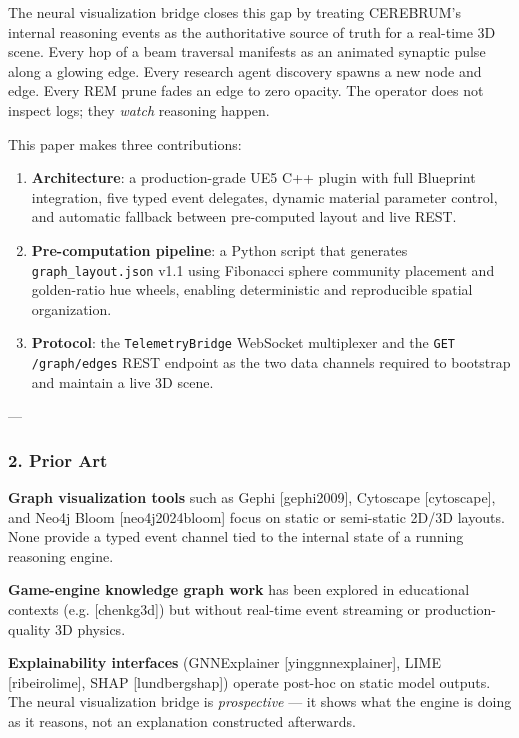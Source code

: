 The neural visua\-lization bridge closes this gap by treating CEREBRUM's internal reasoning events as the autho\-ritative source of truth for a real-time 3D scene. Every hop of a beam traversal manifests as an animated synaptic pulse along a glowing edge. Every research agent discovery spawns a new node and edge. Every REM prune fades an edge to zero opacity. The operator does not inspect logs; they \textit{watch} reasoning happen.

This paper makes three contr\-ibutions:

\begin{enumerate}
\item \textbf{Archit\-ecture}: a production-grade UE5 C++ plugin with full Blueprint integration, five typed event delegates, dynamic material parameter control, and automatic fallback between pre-computed layout and live REST.
\item \textbf{Pre-computation pipeline}: a Python script that generates \texttt{graph\_layout.json} v1.1 using Fibonacci sphere community placement and golden-ratio hue wheels, enabling deter\-ministic and repro\-ducible spatial organ\-ization.
\item \textbf{Protocol}: the \texttt{TelemetryBridge} WebSocket multiplexer and the \texttt{GET /graph/edges} REST endpoint as the two data channels required to bootstrap and maintain a live 3D scene.

\end{enumerate}
---

\subsubsection{2. Prior Art}

\textbf{Graph visua\-lization tools} such as Gephi [gephi2009], Cytoscape [cytoscape\-], and Neo4j Bloom [neo4j2024bloom] focus on static or semi-static 2D/3D layouts. None provide a typed event channel tied to the internal state of a running reasoning engine.

\textbf{Game-engine knowledge graph work} has been explored in educational contexts (e.g. [chen\-kg3d]) but without real-time event streaming or production-quality 3D physics.

\textbf{Explai\-nability interfaces} (GNNExplainer [ying\-gnnex\-plainer], LIME [ribeiro\-lime], SHAP [lundberg\-shap]) operate post-hoc on static model outputs. The neural visua\-lization bridge is \textit{prospective} — it shows what the engine is doing as it reasons, not an explanation constructed afterwards.

